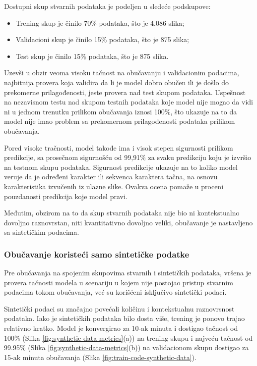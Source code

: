 \documentclass[a4paper,12pt]{article}
\begin{document}
	Dostupni skup stvarnih podataka je podeljen u sledeće podskupove:
	\begin{itemize}
		\item Trening skup je činilo 70\% podataka, što je 4.086 slika;
		\item Validacioni skup je činilo 15\% podataka, što je 875 slika;
		\item Test skup je činilo 15\% podataka, što je 875 slika.
	\end{itemize}
	
	Uzevši u obzir veoma visoku tačnost na obučavanju i validacionim podacima, najbitnija provera koja validira da li je model dobro obučen ili je došlo do prekomerne prilagođenosti, jeste provera nad test skupom podataka. Uspešnost na nezavisnom testu nad skupom testnih podataka koje model nije mogao da vidi ni u jednom trenutku prilikom obučavanja iznosi 100\%, što ukazuje na to da model nije imao problem sa prekomernom prilagođenosti podataka prilikom obučavanja.
	
	Pored visoke tračnosti, model takođe ima i visok stepen sigurnosti prilikom predikcije, sa prosečnom sigurnošću od 99,91\% za svaku predikciju koju je izvršio na testnom skupu podataka. Sigurnost predikcije ukazuje na to koliko model veruje da je određeni karakter ili sekvenca karaktera tačna, na osnovu karakteristika izvučenih iz ulazne slike. Ovakva ocena pomaže u proceni pouzdanosti predikcija koje model pravi.
	
	Međutim, obzirom na to da skup stvarnih podataka nije bio ni kontekstualno dovoljno raznovrstan, niti kvantitativno dovoljno veliki, obučavanje je nastavljeno sa sintetičkim podacima.
	
	\subsubsection{Obučavanje koristeći samo sintetičke podatke}
	Pre obučavanja na spojenim skupovima stvarnih i sintetičkih podataka, vršena je provera tačnosti modela u scenariju u kojem nije postojao pristup stvarnim podacima tokom obučavanja, već su korišćeni isključivo sintetički podaci.
	
	Sintetički podaci su značajno povećali količinu i kontekstualnu raznovrsnost podataka. Iako je sintetičkih podataka bilo dosta više, trening je ponovo trajao relativno kratko. Model je konvergirao za 10-ak minuta i dostigao tačnost od 100\% (Slika \ref{fig:synthetic-data-metrics}(a)) na trening skupu i najveću tačnost od 99.95\% (Slika \ref{fig:synthetic-data-metrics}(b)) na validacionom skupu dostigao za 15-ak minuta obučavanja (Slika \ref{fig:train-code-synthetic-data}).
	
\end{document}

